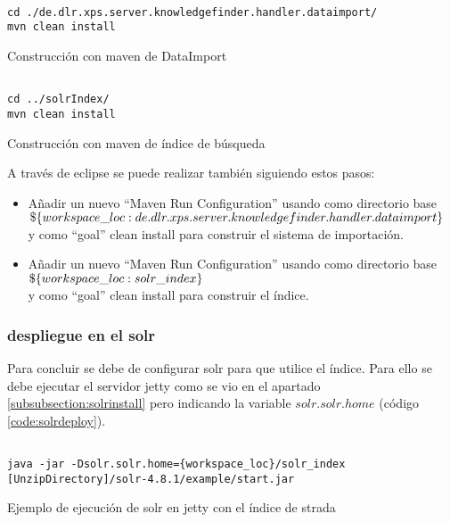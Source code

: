 \begin{listing}[H]
    \begin{verbatim}

cd ./de.dlr.xps.server.knowledgefinder.handler.dataimport/
mvn clean install
    \end{verbatim}
    \caption{Construcción con \gls{maven} de DataImport}
    \label{code:solrbuild1}
\end{listing}

\begin{listing}[H]
    \begin{verbatim}

cd ../solrIndex/
mvn clean install
    \end{verbatim}
    \caption{Construcción con \gls{maven} de índice de búsqueda}
    \label{code:solrbuild2}
\end{listing}


A través de \gls{eclipse} se puede realizar también siguiendo estos pasos:
\begin{itemize}
	\item Añadir un nuevo ``Maven Run Configuration'' usando como directorio base\\
          $\$\{workspace\_loc:\/de.dlr.xps.server.knowledgefinder.handler.dataimport\}$\\
          y como ``goal'' clean install para construir el sistema de importación.
	\item Añadir un nuevo ``Maven Run Configuration'' usando como directorio base\\ 			  $\$\{workspace\_loc:\/solr\_index\}$\\
		  y como ``goal'' clean install para construir el índice.
\end{itemize}

\subsubsection{\Gls{despliegue} en el \gls{solr}}
Para concluir se debe de configurar \gls{solr} para que utilice el índice. Para ello se debe ejecutar el servidor \gls{jetty} como se vio en el apartado \ref{subsubsection:solrinstall} pero indicando la variable $solr.solr.home$ (código \ref{code:solrdeploy}).

\begin{listing}[H]
    \begin{verbatim}

java -jar -Dsolr.solr.home={workspace_loc}/solr_index
[UnzipDirectory]/solr-4.8.1/example/start.jar
    \end{verbatim}
    \caption{Ejemplo de ejecución de \gls{solr} en \gls{jetty} con el índice de \gls{strada}}
    \label{code:solrdeploy}
\end{listing}

